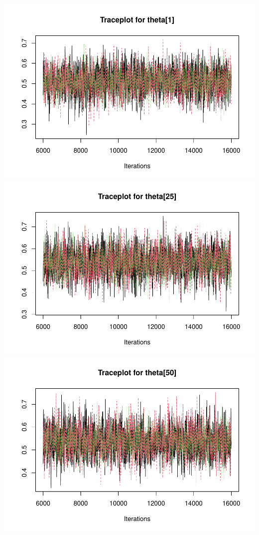 \documentclass[
  11pt,
]{article}
\begin{document}
\includegraphics{Final-Project_files/figure-latex/appendix-code-2-1.pdf}
\includegraphics{Final-Project_files/figure-latex/appendix-code-2-2.pdf}
\includegraphics{Final-Project_files/figure-latex/appendix-code-2-3.pdf}
\end{document}
